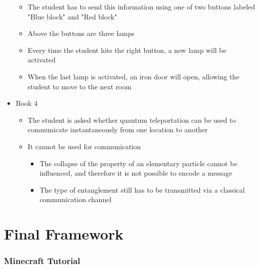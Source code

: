 \documentclass[11pt,twoside]{report} %
\begin{document}
\begin{itemize}
\begin{itemize}
		\item The student has to send this information using one of two buttons labeled "Blue block" and "Red block"
		\item Above the buttons are three lamps
		\item Every time the student hits the right button, a new lamp will be activated
		\item When the last lamp is activated, an iron door will open, allowing the student to move to the next room
	\end{itemize}
	\item Book 4
	\begin{itemize}
		\item The student is asked whether quantum teleportation can be used to communicate instantaneously from one location to another
		\item It cannot be used for communication
		\begin{itemize}
			\item The collapse of the property of an elementary particle cannot be influenced, and therefore it is not possible to encode a message
			\item The type of entanglement still has to be transmitted via a classical communication channel
		\end{itemize}
	\end{itemize}
\end{itemize}

\newpage

\chapter{Final Framework}
\label{app:framework2}

\subsection{Minecraft Tutorial}
\end{document}
